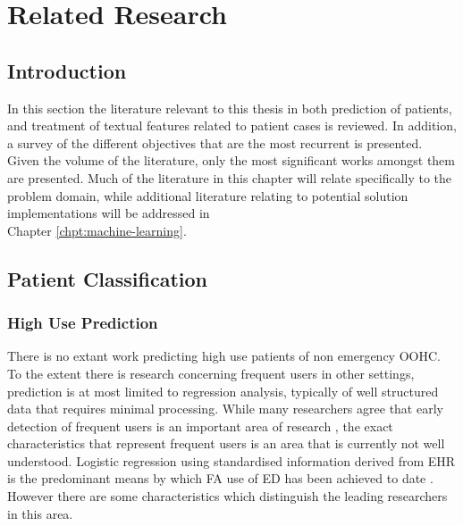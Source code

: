 
 \chapter{Related Research}
\label{chpt:related-research} 


 

 
 
\section{Introduction}

In this section the literature relevant to this thesis in both prediction of patients, and treatment of textual features related to patient cases is reviewed. In addition, a survey of the different objectives that are the most recurrent is presented. Given the volume of the literature, only the most significant works amongst them are presented. Much of the literature in this chapter will relate specifically to the problem domain, while additional literature relating to potential solution implementations will be addressed in \\ Chapter \ref{chpt:machine-learning}.

\section{Patient Classification}



\subsection{High Use Prediction}

There is no extant work predicting high use patients of non emergency OOHC. To the extent there is research concerning frequent users in other settings, prediction is at most limited to regression analysis, typically of well structured data that requires minimal processing. While many researchers agree that early detection of frequent users is an important area of research \cite{vu2015screening,chan2018frequent,meng2017disordered}, the exact characteristics that represent frequent users is an area that is currently not well understood.    
Logistic regression using standardised information derived from EHR is the predominant means by which FA use of ED has been achieved to date \cite{billings2013dispelling,smits2013predictability,scott2014describing}. However there are some characteristics which distinguish the leading researchers in this area. 

